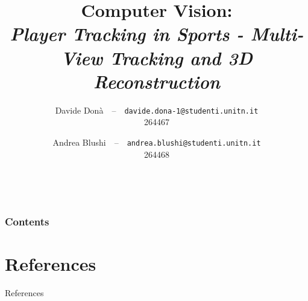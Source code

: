 \documentclass[10pt]{beamer}
\begin{document}
\title[Player Tracking in Sports]{Computer Vision:\\ \normalsize\textit{Player Tracking in Sports - Multi-View Tracking and 3D Reconstruction}
}
\author[University of Trento]{%
  Davide Donà\ \ --\ \ \small\texttt{davide.dona-1@studenti.unitn.it}\\
  \small 264467\\
  \and
  Andrea Blushi\ \ --\ \ \small\texttt{andrea.blushi@studenti.unitn.it}\\
  \small 264468
}


\date[]{\MonthName\ \number\year}

\frame{\titlepage}
\begin{frame}
\frametitle{Contents}
\tableofcontents
\end{frame}








\section*{References}
\begin{frame}[allowframebreaks]{References}
\footnotesize


\end{frame}

\appendix

\end{document}
